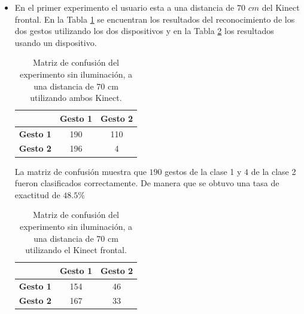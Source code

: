 \begin{itemize}

\item En el primer experimento el usuario esta a una distancia de $70$ $cm$ del Kinect frontal. En la Tabla \ref{table:70LnoK2} se encuentran los resultados del reconocimiento de los dos gestos utilizando los dos dispositivos y en la Tabla \ref{table:70LnoK1} los resultados usando un dispositivo.   


\begin{table}[h!] 
\begin{center} 
\caption{Matriz de confusión del experimento sin iluminación, a una distancia de 70 cm utilizando ambos Kinect.} 
\label{table:70LnoK2}
\renewcommand{\arraystretch}{1.2}
\begin{tabular}{ r || c  c } 
 
        & \textbf{Gesto 1} & \textbf{Gesto 2} \\ \hline \hline  
\textbf{Gesto 1} & 190     &  110     \\ \hline  
\textbf{Gesto 2} & 196     &  4     \\   

\end{tabular}
\end{center} 
\end{table}  

La matriz de confusión muestra que $190$ gestos de la clase 1 y $4$ de la clase 2 fueron clasificados correctamente. De manera que se obtuvo una tasa de exactitud de $48.5 \%$ 

\begin{table}[h!] 
\begin{center} 
\caption{Matriz de confusión del experimento sin iluminación, a una distancia de 70 cm utilizando el Kinect frontal.}
\label{table:70LnoK1} 
\renewcommand{\arraystretch}{1.2}
\begin{tabular}{ r || c  c } 
        & \textbf{Gesto 1} & \textbf{Gesto 2} \\ \hline \hline  
\textbf{Gesto 1} & 154     &  46     \\ \hline  
\textbf{Gesto 2} & 167     &  33     \\   
\end{tabular}
\end{center} 
\end{table}  


\end{itemize}
